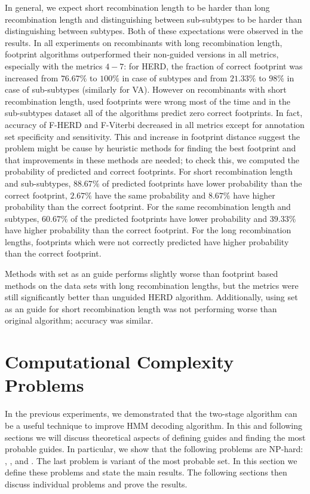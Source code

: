 In general, we expect short recombination length to be harder than long
recombination length and distinguishing between sub-subtypes to be harder than
distinguishing between subtypes. Both of these expectations were observed in
the results. In all experiments on recombinants with long recombination length,
footprint algorithms outperformed their non-guided versions in all metrics,
especially with the metrics $4-7$: for HERD, the fraction of correct footprint
was increased from $76.67\%$ to $100\%$ in case of subtypes and from $21.33\%$
to $98\%$ in case of sub-subtypes (similarly for VA). However on recombinants
with short recombination length, used footprints were wrong most of the time
and in the sub-subtypes dataset all of the algorithms predict zero correct
footprints.  In fact, accuracy of F-HERD and F-Viterbi decreased in all metrics
except for annotation set specificity and sensitivity. This and increase in
footprint distance suggest the problem might be cause by heuristic methods for
finding the best footprint and that improvements in these methods are needed;
to check this, we computed the probability of predicted and correct footprints.
For short recombination length and sub-subtypes, $88.67\%$ of predicted
footprints have lower probability than the correct footprint, $2.67\%$ have the
same probability and $8.67\%$ have higher probability than the correct
footprint.  For the same recombination length and subtypes, $60.67\%$ of the
predicted footprints have lower probability and $39.33\%$ have higher
probability than the correct footprint.  For the long recombination lengths,
footprints which were not correctly predicted have higher probability than the
correct footprint.

Methods with set as an guide performs slightly worse than footprint based
methods on the data sets with long recombination lengths, but the metrics were
still significantly better than unguided HERD algorithm.  Additionally, using
set as an guide for short recombination length was not performing worse than
original algorithm; accuracy was similar.

\section{Computational Complexity Problems}

In the previous experiments, we demonstrated that the two-stage algorithm can
be a useful technique to improve HMM decoding algorithm. In this and following
sections we will discuss theoretical aspects of defining guides and finding the
most probable guides. In particular, we show that the following problems are
NP-hard: , , and . The last problem is
variant of the most probable set. In this section we define these problems and
state the main results. The following sections then discuss individual problems
and prove the results.

